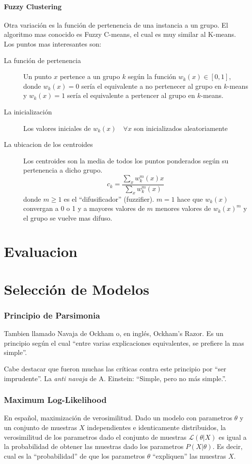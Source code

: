 \documentclass[10pt,a4paper]{article}
\begin{document}
\subsection{Fuzzy Clustering}
Otra variación es la función de pertenencia de una instancia a un grupo. El algoritmo mas conocido es Fuzzy C-means, el cual es muy similar al K-means\cite{bezdek1984fcm}. Los puntos mas interesantes son:
\begin{description}
\item[La función de pertenencia] Un punto $x$ pertence a un grupo $k$ según la función $w_k(x) \in [0, 1]$, donde $w_k(x) = 0$ sería el equivalente a no pertenecer al grupo en $k$-means y $w_k(x) = 1$ sería el equivalente a pertencer al grupo en $k$-means.
\item[La inicialización] Los valores iniciales de $w_k(x)\quad \forall x$ son inicializados aleatoriamente
\item[La ubicacion de los centroides] Los centroides son la media de todos los puntos ponderados según su pertenencia a dicho grupo.
  \[
  c_k = \frac{\sum_x w_k^m(x)x}{\sum_x w_k^m(x)}
  \]
  donde $m \geq 1$ es el ``difusificador'' (fuzzifier). $m=1$ hace que $w_k(x)$ convergan a 0 o 1 y a mayores valores de $m$ menores valores de $w_k(x)^m$ y el grupo se vuelve mas difuso.
\end{description}

\part{Evaluacion}


\part{Selección de Modelos}
\section{Principio de Parsimonia}
Tambien llamado Navaja de Ockham o, en inglés, Ockham's Razor. Es un principio según el cual ``entre varias explicaciones equivalentes, se prefiere la mas simple''. 

Cabe destacar que fueron muchas las críticas contra este principio por ``ser imprudente''. La \textit{anti navaja} de A. Einstein: ``Simple, pero no más simple.''.

\section{Maximum Log-Likelihood}
En español, maximización de verosimilitud. Dado un modelo con parametros $\theta$ y un conjunto de muestras $X$ independientes e identicamente distribuidos, la verosimilitud de los parametros dado el conjunto de muestras $\mathcal{L}(\theta|X)$ es igual a la probabilidad de obtener las muestras dado los parametros $P(X|\theta)$. Es decir, cual es la ``probabilidad'' de que los parametros $\theta$ ``expliquen'' las muestras $X$.
\end{document}
